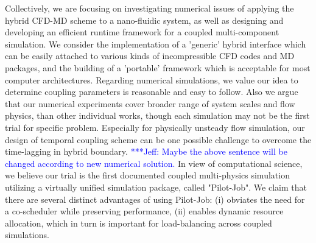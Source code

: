 \documentclass[conference,final]{IEEEtran}
\newcommand{\skonote}[1]{ {\textcolor{blue} { ***Jeff: #1 }}}
\newcommand{\skonote}[1]{}
\begin{document}
Collectively, we are focusing on investigating numerical issues of applying the hybrid CFD-MD scheme to a nano-fluidic system, as well as designing and developing an efficient runtime framework for a coupled multi-component simulation. We consider the implementation of a 'generic' hybrid interface which can be easily attached to various kinds of incompressible CFD codes and MD packages, and the building of a 'portable' framework which is acceptable for most computer architectures. Regarding numerical simulations, we value our idea to determine coupling parameters is reasonable and easy to follow. Also we argue that our numerical experiments cover broader range of system scales and flow physics, than other individual works, though each simulation may not be the first trial for specific problem. Especially for physically unsteady flow simulation, our design of temporal coupling scheme can be one possible challenge to overcome the time-lagging in hybrid boundary.
\skonote{Maybe the above sentence will be changed according to new numerical solution.}
In view of computational science, we believe our trial is the first documented coupled multi-physics simulation utilizing a virtually unified simulation package, called "Pilot-Job". We claim that there are several distinct advantages of using Pilot-Job: (i) obviates the need for a co-scheduler while preserving performance, (ii) enables dynamic resource allocation, which in turn is important for load-balancing across coupled simulations. %
\end{document}
